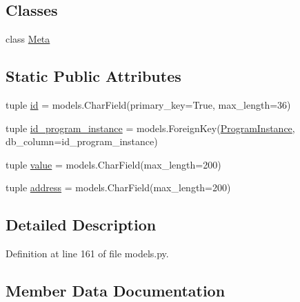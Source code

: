 \subsection*{Classes}
\begin{DoxyCompactItemize}
\item 
class \hyperlink{classmemoryoracle_1_1models_1_1Float_1_1Meta}{Meta}
\end{DoxyCompactItemize}
\subsection*{Static Public Attributes}
\begin{DoxyCompactItemize}
\item 
tuple \hyperlink{classmemoryoracle_1_1models_1_1Float_aded74b5ac3f60ce974c7ab2ba1894bb8}{id} = models.\+Char\+Field(primary\+\_\+key=True, max\+\_\+length=36)
\item 
tuple \hyperlink{classmemoryoracle_1_1models_1_1Float_a4ac54166d455e2f4339ddd2393ef7dec}{id\+\_\+program\+\_\+instance} = models.\+Foreign\+Key(\textquotesingle{}\hyperlink{classmemoryoracle_1_1models_1_1ProgramInstance}{Program\+Instance}\textquotesingle{}, db\+\_\+column=\textquotesingle{}id\+\_\+program\+\_\+instance\textquotesingle{})
\item 
tuple \hyperlink{classmemoryoracle_1_1models_1_1Float_a822e38f5c09e6dc2819d293b83a20df6}{value} = models.\+Char\+Field(max\+\_\+length=200)
\item 
tuple \hyperlink{classmemoryoracle_1_1models_1_1Float_ad95190c8fdf7df2c0086ee24be73799c}{address} = models.\+Char\+Field(max\+\_\+length=200)
\end{DoxyCompactItemize}


\subsection{Detailed Description}


Definition at line 161 of file models.\+py.



\subsection{Member Data Documentation}
\hypertarget{classmemoryoracle_1_1models_1_1Float_ad95190c8fdf7df2c0086ee24be73799c}{}
